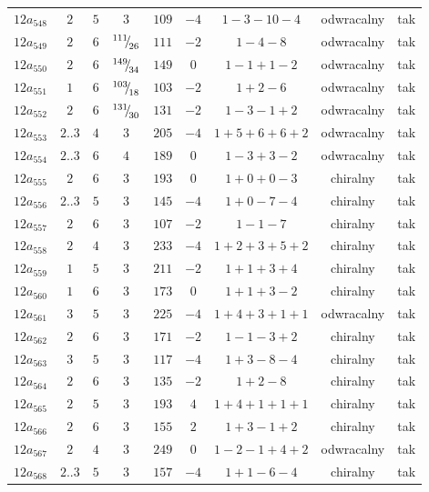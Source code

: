 \begin{longtable}{ccccccccc}
$12a_{548}$ & $2$ & $5$ & $3$ & $109$ & $-4$ & $1-3-10-4$ & odwracalny & tak \\
$12a_{549}$ & $2$ & $6$ & ${}^{111}{\mskip -5mu/\mskip -3mu}_{26}$ & $111$ & $-2$ & $1-4-8$ & odwracalny & tak \\
$12a_{550}$ & $2$ & $6$ & ${}^{149}{\mskip -5mu/\mskip -3mu}_{34}$ & $149$ & $0$ & $1-1+1-2$ & odwracalny & tak \\
$12a_{551}$ & $1$ & $6$ & ${}^{103}{\mskip -5mu/\mskip -3mu}_{18}$ & $103$ & $-2$ & $1+2-6$ & odwracalny & tak \\
$12a_{552}$ & $2$ & $6$ & ${}^{131}{\mskip -5mu/\mskip -3mu}_{30}$ & $131$ & $-2$ & $1-3-1+2$ & odwracalny & tak \\
$12a_{553}$ & $2..3$ & $4$ & $3$ & $205$ & $-4$ & $1+5+6+6+2$ & odwracalny & tak \\
$12a_{554}$ & $2..3$ & $6$ & $4$ & $189$ & $0$ & $1-3+3-2$ & odwracalny & tak \\
$12a_{555}$ & $2$ & $6$ & $3$ & $193$ & $0$ & $1+0+0-3$ & chiralny & tak \\
$12a_{556}$ & $2..3$ & $5$ & $3$ & $145$ & $-4$ & $1+0-7-4$ & chiralny & tak \\
$12a_{557}$ & $2$ & $6$ & $3$ & $107$ & $-2$ & $1-1-7$ & chiralny & tak \\
$12a_{558}$ & $2$ & $4$ & $3$ & $233$ & $-4$ & $1+2+3+5+2$ & chiralny & tak \\
$12a_{559}$ & $1$ & $5$ & $3$ & $211$ & $-2$ & $1+1+3+4$ & chiralny & tak \\
$12a_{560}$ & $1$ & $6$ & $3$ & $173$ & $0$ & $1+1+3-2$ & chiralny & tak \\
$12a_{561}$ & $3$ & $5$ & $3$ & $225$ & $-4$ & $1+4+3+1+1$ & odwracalny & tak \\
$12a_{562}$ & $2$ & $6$ & $3$ & $171$ & $-2$ & $1-1-3+2$ & chiralny & tak \\
$12a_{563}$ & $3$ & $5$ & $3$ & $117$ & $-4$ & $1+3-8-4$ & chiralny & tak \\
$12a_{564}$ & $2$ & $6$ & $3$ & $135$ & $-2$ & $1+2-8$ & chiralny & tak \\
$12a_{565}$ & $2$ & $5$ & $3$ & $193$ & $4$ & $1+4+1+1+1$ & chiralny & tak \\
$12a_{566}$ & $2$ & $6$ & $3$ & $155$ & $2$ & $1+3-1+2$ & chiralny & tak \\
$12a_{567}$ & $2$ & $4$ & $3$ & $249$ & $0$ & $1-2-1+4+2$ & odwracalny & tak \\
$12a_{568}$ & $2..3$ & $5$ & $3$ & $157$ & $-4$ & $1+1-6-4$ & chiralny & tak \\

\end{longtable}

